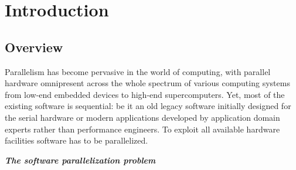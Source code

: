 \chapter{Introduction}
\label{introduction}
\section{Overview}
\label{introduction_overview}
\quad Parallelism has become pervasive in the world of computing, with parallel hardware omnipresent across the whole spectrum of various computing systems from low-end embedded devices to high-end supercomputers. Yet, most of the existing software is sequential: be it an old legacy software initially designed for the serial hardware or modern applications developed by application domain experts rather than performance engineers. To exploit all available hardware facilities software has to be parallelized.
\begin{center}
\textbf{\large \textit{The software parallelization problem}}
\end{center}
